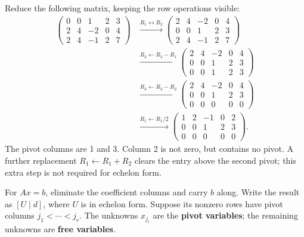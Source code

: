 \begin{example}\label{example:01:echelon}
Reduce the following matrix, keeping the row operations visible:
\begin{align*}
\begin{pmatrix}0&0&1&2&3\\2&4&-2&0&4\\2&4&-1&2&7\end{pmatrix}
&\xrightarrow{R_1\leftrightarrow R_2}
\begin{pmatrix}2&4&-2&0&4\\0&0&1&2&3\\2&4&-1&2&7\end{pmatrix}\\
&\xrightarrow{R_3\leftarrow R_3-R_1}
\begin{pmatrix}2&4&-2&0&4\\0&0&1&2&3\\0&0&1&2&3\end{pmatrix}\\
&\xrightarrow{R_3\leftarrow R_3-R_2}
\begin{pmatrix}2&4&-2&0&4\\0&0&1&2&3\\0&0&0&0&0\end{pmatrix}\\
&\xrightarrow{R_1\leftarrow R_1/2}
\begin{pmatrix}1&2&-1&0&2\\0&0&1&2&3\\0&0&0&0&0\end{pmatrix}.
\end{align*}
The pivot columns are 1 and 3. Column 2 is not zero, but contains no
pivot. A further replacement \(R_1\leftarrow R_1+R_2\) clears the entry
above the second pivot; this extra step is not required for echelon form.
\end{example}

For \(Ax=b\), eliminate the coefficient columns and carry \(b\) along.
Write the result as \([U\mid d]\), where \(U\) is in echelon form.
Suppose its nonzero rows have pivot columns \(j_1<\cdots<j_r\).
The unknowns \(x_{j_i}\) are the \textbf{pivot variables}; the remaining
unknowns are \textbf{free variables}.

